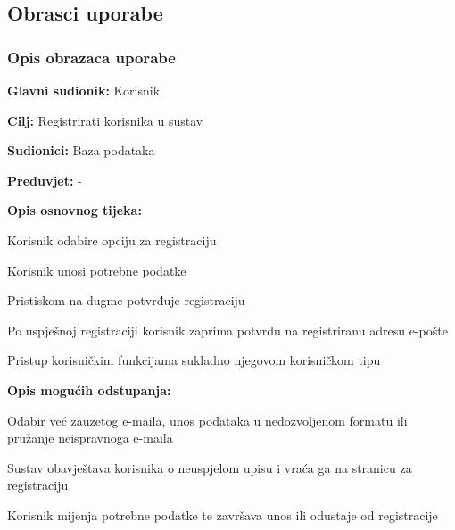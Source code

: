 			\eject 
			
			
				
			\subsection{Obrasci uporabe}
				
				\subsubsection{Opis obrazaca uporabe}
				
				    \noindent {}
					\begin{packed_item}
	
						\item \textbf{Glavni sudionik: }Korisnik
						\item  \textbf{Cilj:} Registrirati korisnika u sustav
						\item  \textbf{Sudionici:} Baza podataka
						\item  \textbf{Preduvjet:} -
						\item  \textbf{Opis osnovnog tijeka:}
						
						\item[] \begin{packed_enum}
	
							\item Korisnik odabire opciju za registraciju
							\item Korisnik unosi potrebne podatke
							\item Pristiskom na dugme potvrđuje registraciju
							\item Po uspješnoj registraciji korisnik zaprima potvrdu na registriranu adresu e-pošte
							\item Pristup korisničkim funkcijama sukladno njegovom korisničkom tipu
						\end{packed_enum}
						
						\item  \textbf{Opis mogućih odstupanja:}
						
						\item[] \begin{packed_item}
	
							\item[2.a] Odabir već zauzetog e-maila, unos podataka u nedozvoljenom formatu ili pružanje neispravnoga e-maila 
							\item[] \begin{packed_enum}
								
								\item Sustav obavještava korisnika o neuspjelom upisu i vraća ga na stranicu za registraciju
								\item Korisnik mijenja potrebne podatke te završava unos ili odustaje od registracije
								
							\end{packed_enum}
						\end{packed_item}
					\end{packed_item}
				
